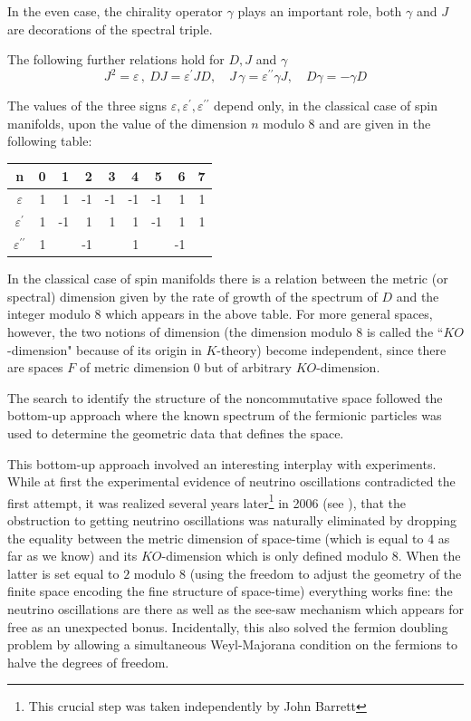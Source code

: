 \documentclass[12pt]{article}
\begin{document}
In the even case, the chirality operator $\gamma$ plays an important role, both $\gamma$ and $J$ are decorations of the spectral triple.

 The following further relations hold  for $D,J$ and $\gamma$
$$
J^2=\varepsilon\,, \ DJ=\varepsilon^{\prime}JD,\quad
J\,\gamma=\varepsilon^{\prime\prime }\gamma J,\quad D\gamma=-\gamma D
$$

 The values of the three signs $\varepsilon,\varepsilon^{\prime
},\varepsilon^{\prime\prime}$ depend only, in the classical case of spin
manifolds, upon the value of the dimension $n$ modulo $8$ and are given in the
following table:
\begin{center}
 \begin{tabular}
[c]{|c|rrrrrrrr|}\hline \textbf{n } & 0 & 1 & 2 & 3 & 4 & 5 & 6 &
7\\\hline\hline
$\varepsilon$ & 1 & 1 & -1 & -1 & -1 & -1 & 1 & 1\\
$\varepsilon^{\prime}$ & 1 & -1 & 1 & 1 & 1 & -1 & 1 & 1\\
$\varepsilon^{\prime\prime}$ & 1 &  & -1 &  & 1 &  & -1 & \\\hline
\end{tabular}
\end{center}

In the classical case of spin manifolds there is  a relation between the
metric (or spectral) dimension given by the rate of growth of the spectrum of
$D$ and the integer modulo $8$ which appears in the above table. For more
general spaces, however, the two notions of dimension (the dimension modulo $8$
is called the ``$KO$-dimension" because of its origin in $K$-theory) become
independent, since there are spaces $F$ of  metric dimension $0$ but of
arbitrary $KO$-dimension.

The search
to identify the structure of the noncommutative space followed the bottom-up
approach where the known spectrum of the fermionic particles was used to
determine the geometric data that defines the space. 

This bottom-up approach
involved an interesting interplay with experiments. While at first the
experimental evidence of neutrino oscillations contradicted the first attempt, it was realized several years later\footnote{This crucial step was taken independently by John Barrett} in 2006 (see \cite{mc2}),  that the
obstruction to getting neutrino oscillations was naturally eliminated by dropping
the equality between the metric dimension of space-time (which is equal to $4$
as far as we know) and its $KO$-dimension which is only defined modulo $8$.
When the latter is set equal to $2$ modulo $8$  (using the freedom to adjust the geometry of the finite space
encoding the fine structure of space-time) everything works fine: the neutrino
oscillations are there as well as the see-saw mechanism which appears for free
as an unexpected bonus. Incidentally, this also solved the fermion doubling
problem by allowing a simultaneous Weyl-Majorana condition on the fermions to
halve the degrees of freedom.
\end{document}
